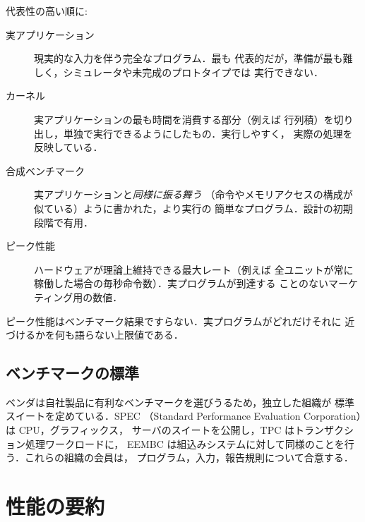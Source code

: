 \documentclass[../main.tex]{subfiles}
\begin{document}
代表性の高い順に:
\begin{description}
  \item[実アプリケーション] 現実的な入力を伴う完全なプログラム．最も
    代表的だが，準備が最も難しく，シミュレータや未完成のプロトタイプでは
    実行できない．
  \item[カーネル] 実アプリケーションの最も時間を消費する部分（例えば
    行列積）を切り出し，単独で実行できるようにしたもの．実行しやすく，
    実際の処理を反映している．
  \item[合成ベンチマーク] 実アプリケーションと\emph{同様に振る舞う}
    （命令やメモリアクセスの構成が似ている）ように書かれた，より実行の
    簡単なプログラム．設計の初期段階で有用．
  \item[ピーク性能] ハードウェアが理論上維持できる最大レート（例えば
    全ユニットが常に稼働した場合の毎秒命令数）．実プログラムが到達する
    ことのないマーケティング用の数値．
\end{description}

\begin{note}
  ピーク性能はベンチマーク結果ですらない．実プログラムがどれだけそれに
  近づけるかを何も語らない上限値である．
\end{note}

\subsection{ベンチマークの標準}

ベンダは自社製品に有利なベンチマークを選びうるため，独立した組織が
標準スイートを定めている．SPEC
（Standard Performance Evaluation Corporation）は CPU，グラフィックス，
サーバのスイートを公開し，TPC はトランザクション処理ワークロードに，
EEMBC は組込みシステムに対して同様のことを行う．これらの組織の会員は，
プログラム，入力，報告規則について合意する．

\section{性能の要約}
\end{document}
